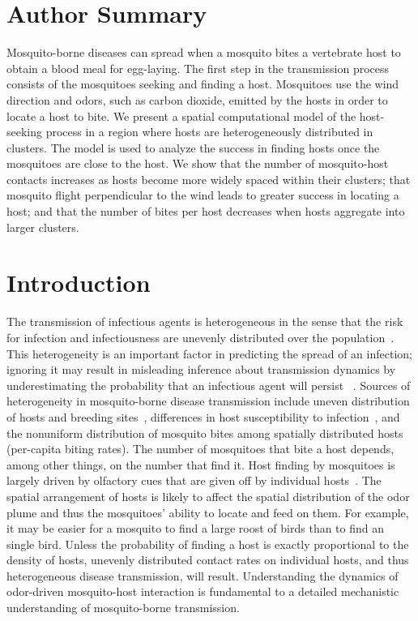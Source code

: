 \documentclass[10pt]{article}
\begin{document}
\section*{Author Summary}
Mosquito-borne diseases can spread when a mosquito bites a vertebrate host to obtain a blood meal for egg-laying.  The first step in the transmission process consists of the mosquitoes seeking and finding a host.  Mosquitoes use the wind direction and odors, such as carbon dioxide, emitted by the hosts in order to locate a host to bite.  We present a spatial computational model of the host-seeking process in a region where hosts are heterogeneously distributed in clusters.  The model is used to analyze the success in finding hosts once the mosquitoes are close to the host.  
We show that the number of mosquito-host contacts increases as hosts become more widely spaced within their clusters; that mosquito flight perpendicular to the wind leads to greater success in locating a host; and that the number of bites per host decreases when hosts aggregate into larger clusters. 

\section*{Introduction}
The transmission of infectious agents is heterogeneous in the sense that the risk for infection and infectiousness are unevenly distributed over the population~\cite{Woolhouse1997}. This heterogeneity is an important factor in predicting the spread of an infection; ignoring it may result in misleading inference about transmission dynamics by underestimating the probability that an infectious agent will persist ~\cite{Hasibeder1988}.  Sources of heterogeneity in mosquito-borne disease transmission include uneven distribution of hosts and breeding sites~\cite{SmithEtAl2004A}, differences in host susceptibility to infection~\cite{SmithDushoffSnowHay2005}, and the nonuniform distribution of mosquito bites among spatially distributed hosts~\cite{Dye1986} (per-capita biting rates).
The number of mosquitoes that bite a host depends, among other things, on the number that find it.
Host finding by mosquitoes is largely driven by olfactory cues that are given off by individual
hosts~\cite{Lehane1991}.
The spatial arrangement of hosts is likely to affect the spatial distribution of the odor plume and thus the mosquitoes' ability to locate and feed on them. For example, it may be easier for a mosquito to find a large roost of birds than to find an single bird.  Unless the probability of finding a host is exactly proportional to the density of hosts, unevenly distributed contact rates on individual hosts, and thus heterogeneous disease transmission, will result.  Understanding the dynamics of odor-driven mosquito-host interaction is fundamental to a detailed mechanistic understanding of mosquito-borne transmission.
\end{document}
